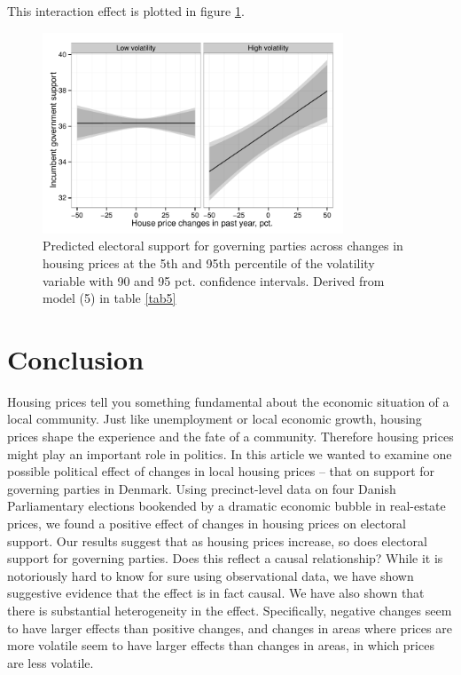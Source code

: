 \documentclass[12pt,a4paper]{article}
\begin{document}


This interaction effect is plotted in figure \ref{vola}.

\begin{figure}[htbp]
	\includegraphics[page=1,width=0.8\textwidth]{../figures/volaplot}
	\centering
	\caption{Predicted electoral support for governing parties across changes in housing prices at the 5th and 95th percentile of the volatility variable with 90 and 95 pct. confidence intervals. Derived from model (5) in table \ref{tab5}}
	\label{vola}
\end{figure}






\section{Conclusion}
Housing prices tell you something fundamental about the economic situation of  a local community. Just like unemployment or local economic growth, housing prices shape the experience and the fate of a community. Therefore housing prices might play an important role in politics. In this article we wanted to examine one possible political effect of changes in local housing prices -- that on support for governing parties in Denmark. Using precinct-level data on four Danish Parliamentary elections bookended by a dramatic economic bubble in real-estate prices, we found a positive effect of changes in housing prices on electoral support. Our results suggest that as housing prices increase, so does electoral support for governing parties. Does this reflect a causal relationship? While it is notoriously hard to know for sure using observational data, we have shown suggestive evidence that the effect is in fact causal. We have also shown that there is substantial heterogeneity in the effect. Specifically, negative changes seem to have larger effects than positive changes, and changes in areas where prices are more volatile seem to have larger effects than changes in areas, in which prices are less volatile.
\end{document}
